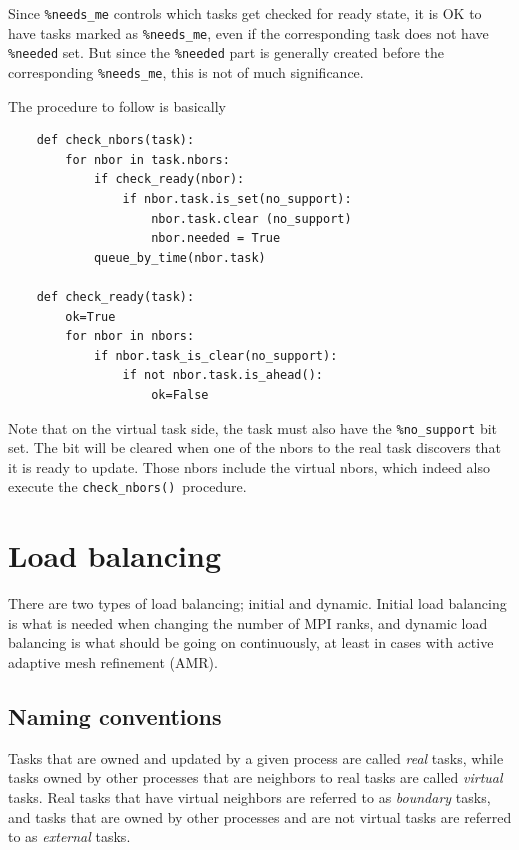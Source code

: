 \documentclass[paper=a4,fontsize=11pt]{scrartcl}
\numberwithin{equation}{section}		%
\numberwithin{figure}{section}			%
\numberwithin{table}{section}				%
\newcommand{\codecolor}{\color{Blue}}
\newcommand{\Code}[1]{{\codecolor\texttt{#1}}}
\def\checknbors{\Code{check\_nbors()}}
\begin{document}
Since \Code{\%needs\_me} controls which tasks get checked for ready state, it is OK to have tasks marked as \Code{\%needs\_me}, even if the corresponding task does not have \Code{\%needed} set.  But since the \Code{\%needed} part is generally created before the corresponding \Code{\%needs\_me}, this is not of much significance.

The procedure to follow is basically
{\codecolor \begin{verbatim}
    def check_nbors(task):
        for nbor in task.nbors:
            if check_ready(nbor):
                if nbor.task.is_set(no_support):
                    nbor.task.clear (no_support)
                    nbor.needed = True
            queue_by_time(nbor.task)

    def check_ready(task):
        ok=True
        for nbor in nbors:
            if nbor.task_is_clear(no_support):
                if not nbor.task.is_ahead():
                    ok=False
\end{verbatim}}

Note that on the virtual task side, the task must also have the \Code{\%no\_support} bit set.  The bit will be cleared when one of the nbors to the real task discovers that it is ready to update.  Those nbors include the virtual nbors, which indeed also execute the \checknbors\ procedure.



\section{Load balancing}
There are two types of load balancing; initial and dynamic.  Initial load balancing is what is needed when changing the number of MPI ranks, and dynamic load balancing is what should be going on continuously, at least in cases with active adaptive mesh refinement (AMR).

\subsection{Naming conventions}
Tasks that are owned and updated by a given process are called \textit{real} tasks, while tasks owned by other processes that are neighbors to real tasks are called \textit{virtual} tasks.  Real tasks that have virtual neighbors are referred to as \textit{boundary} tasks, and tasks that are owned by other processes and are not virtual tasks are referred to as \textit{external} tasks.
\end{document}
